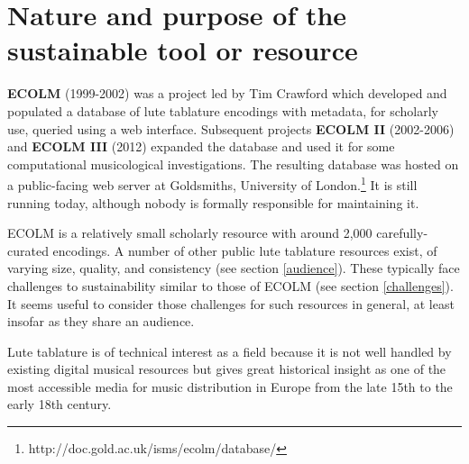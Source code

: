 \documentclass[sigconf]{acmart}
\begin{document}
\maketitle
\begin{sloppypar}


  \section{Nature and purpose of the sustainable tool or resource}

  {\bf ECOLM} (1999-2002) was a project led by Tim Crawford which
  developed and populated a database of lute tablature encodings with
  metadata, for scholarly use, queried using a web
  interface. Subsequent projects {\bf ECOLM II} (2002-2006) and {\bf
    ECOLM III} (2012) expanded the database and used it for some
  computational musicological investigations. The resulting database
  was hosted on a public-facing web server at Goldsmiths, University
  of London.\footnote{http://doc.gold.ac.uk/isms/ecolm/database/} It
  is still running today, although nobody is formally responsible for
  maintaining it.

  ECOLM is a relatively small scholarly resource with around 2,000
  carefully-curated encodings. A number of other public lute tablature
  resources exist, of varying size, quality, and consistency (see
  section \ref{audience}). These typically face challenges to
  sustainability similar to those of ECOLM (see section
  \ref{challenges}). It seems useful to consider those challenges for
  such resources in general, at least insofar as they share an
  audience.

  Lute tablature is of technical interest as a field because it is not
  well handled by existing digital musical resources but gives great
  historical insight as one of the most accessible media for music
  distribution in Europe from the late 15th to the early 18th century.
  

\end{sloppypar}
\end{document}
